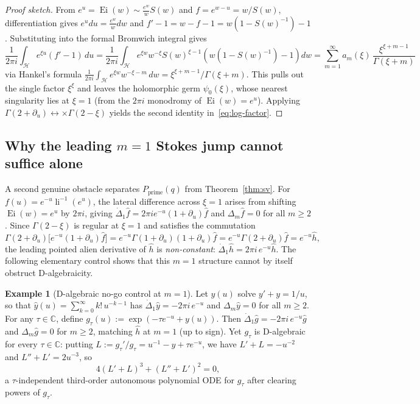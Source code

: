 \documentclass[10pt,reqno]{amsart}
\numberwithin{equation}{section}
\theoremstyle{definition}
\newtheorem{example}[proposition]{Example}
\newcommand{\C}{\mathbb{C}}
\DeclareMathOperator{\li}{li}
\DeclareMathOperator{\Ei}{Ei}
\begin{document}
\begin{proof}[Proof sketch]
From $e^u = \Ei(w) \sim \frac{e^w}{w} S(w)$ and $f = e^{w-u} = w / S(w)$, differentiation gives $e^u du = \frac{e^w}{w} dw$ and $f' - 1 = w - f - 1 = w(1 - S(w)^{-1}) - 1$. Substituting into the formal Bromwich integral gives
\[
  \frac{1}{2\pi i}\int_{\mathcal{H}} e^{\xi u} (f' - 1)\,du
  = \frac{1}{2\pi i}\int_{\mathcal{H}} e^{\xi w} w^{-\xi} S(w)^{\xi-1}\!\left(w(1 - S(w)^{-1}) - 1\right) dw
  = \sum_{m=1}^\infty a_m(\xi)\, \frac{\xi^{\xi + m - 1}}{\Gamma(\xi + m)}
\]
via Hankel's formula $\frac{1}{2\pi i}\int_{\mathcal{H}} e^{\xi w} w^{-\xi-m}\,dw = \xi^{\xi+m-1}/\Gamma(\xi+m)$. This pulls out the single factor $\xi^\xi$ and leaves the holomorphic germ $\psi_0(\xi)$, whose nearest singularity lies at $\xi = 1$ (from the $2\pi i$ monodromy of $\Ei(w) = e^u$). Applying $\Gamma(2 + \partial_u) \leftrightarrow \times \Gamma(2-\xi)$ yields the second identity in~\eqref{eq:log-factor}.
\end{proof}

\subsection{Why the leading \texorpdfstring{$m=1$}{m=1} Stokes jump cannot suffice alone}
A second genuine obstacle separates $P_{\mathrm{prime}}(q)$ from Theorem~\ref{thm:sv}. For $f(u) = e^{-u}\li^{-1}(e^u)$, the lateral difference across $\xi = 1$ arises from shifting $\Ei(w) = e^u$ by $2\pi i$, giving $\dot{\Delta}_1 \widehat{f} = 2\pi i e^{-u}(1 + \partial_u)\widehat{f}$ and $\Delta_m \widehat{f} = 0$ for all $m \ge 2$. Since $\Gamma(2 - \xi)$ is regular at $\xi = 1$ and satisfies the commutation
\[
  \Gamma(2 + \partial_u)\bigl[e^{-u}(1 + \partial_u)\widehat{f}\bigr]
  = e^{-u} \Gamma(1 + \partial_u)(1 + \partial_u)\widehat{f}
  = e^{-u} \Gamma(2 + \partial_u)\widehat{f} = e^{-u}\widehat{h},
\]
the leading pointed alien derivative of $\widehat{h}$ is \emph{non-constant}: $\dot{\Delta}_1 \widehat{h} = 2\pi i\, e^{-u}\widehat{h}$. The following elementary control shows that this $m = 1$ structure cannot by itself obstruct D-algebraicity.

\begin{example}[D-algebraic no-go control at $m = 1$]\label{ex:control}
Let $y(u)$ solve $y' + y = 1/u$, so that $\widehat{y}(u) = \sum_{k=0}^\infty k!\, u^{-k-1}$ has $\dot{\Delta}_1 \widehat{y} = -2\pi i\, e^{-u}$ and $\Delta_m \widehat{y} = 0$ for all $m \ge 2$. For any $\tau \in \C$, define $g_\tau(u) := \exp(-\tau e^{-u} + y(u))$. Then $\dot{\Delta}_1 \widehat{g} = -2\pi i\, e^{-u}\widehat{g}$ and $\Delta_m \widehat{g} = 0$ for $m \ge 2$, matching $\widehat{h}$ at $m = 1$ (up to sign). Yet $g_\tau$ is D-algebraic for every $\tau \in \C$: putting $L := g_\tau'/g_\tau = u^{-1} - y + \tau e^{-u}$, we have $L' + L = -u^{-2}$ and $L'' + L' = 2 u^{-3}$, so
\[
  4(L' + L)^3 + (L'' + L')^2 = 0,
\]
a $\tau$-independent third-order autonomous polynomial ODE for $g_\tau$ after clearing powers of $g_\tau$.
\end{example}
\end{document}
